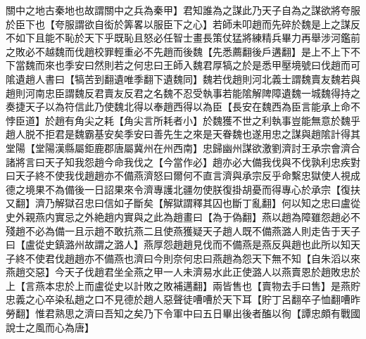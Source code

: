 關中之地古秦地也故謂關中之兵為秦甲】君知誰為之謀此乃天子自為之謀欲將夸服於臣下也【夸服謂欲自衒於筭畧以服臣下之心】若師未叩趙而先碎於魏是上之謀反不如下且能不恥於天下乎既恥且怒必任智士畫長策仗猛將練精兵畢力再舉涉河鑑前之敗必不越魏而伐趙校罪輕重必不先趙而後魏【先悉薦翻後戶遘翻】是上不上下不下當魏而來也季安曰然則若之何忠曰王師入魏君厚犒之於是悉甲壓境號曰伐趙而可隂遺趙人書曰【犒苦到翻遺唯季翻下遺魏同】魏若伐趙則河北義士謂魏賣友魏若與趙則河南忠臣謂魏反君賣友反君之名魏不忍受執事若能隂解陴障遺魏一城魏得持之奏捷天子以為符信此乃使魏北得以奉趙西得以為臣【長安在魏西為臣言能承上命不悖臣道】於趙有角尖之耗【角尖言所耗者小】於魏獲不世之利執事豈能無意於魏乎趙人脱不拒君是魏霸基安矣季安曰善先生之來是天眷魏也遂用忠之謀與趙隂計得其堂陽【堂陽漢縣屬鉅鹿郡唐屬冀州在州西南】忠歸幽州謀欲激劉濟討王承宗會濟合諸將言曰天子知我怨趙今命我伐之【今當作必】趙亦必大備我伐與不伐孰利忠疾對曰天子終不使我伐趙趙亦不備燕濟怒曰爾何不直言濟與承宗反乎命繫忠獄使人視成德之境果不為備後一日詔果來令濟專護北疆勿使朕復掛胡憂而得專心於承宗【復扶又翻】濟乃解獄召忠曰信如子斷矣【解獄謂釋其囚也斷丁亂翻】何以知之忠曰盧從史外親燕内實忌之外絶趙内實與之此為趙畫曰【為于偽翻】燕以趙為障雖怨趙必不殘趙不必為備一且示趙不敢抗燕二且使燕獲疑天子趙人既不備燕潞人則走告于天子曰【盧從史鎮潞州故謂之潞人】燕厚怨趙趙見伐而不備燕是燕反與趙也此所以知天子終不使君伐趙趙亦不備燕也濟曰今則奈何忠曰燕趙為怨天下無不知【自朱滔以來燕趙交惡】今天子伐趙君坐全燕之甲一人未濟易水此正使潞人以燕賣恩於趙敗忠於上【言燕本忠於上而盧從史以計敗之敗補邁翻】兩皆售也【賣物去手曰售】是燕貯忠義之心卒染私趙之口不見德於趙人惡聲徒嘈嘈於天下耳【貯丁呂翻卒子恤翻嘈昨勞翻】惟君熟思之濟曰吾知之矣乃下令軍中曰五日畢出後者醢以徇【譚忠頗有戰國說士之風而心為唐】

